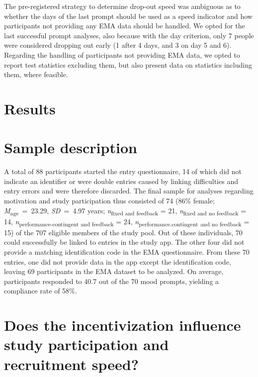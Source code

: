 \documentclass[authordate, empirical]{jote-new-article}
\begin{document}
	The pre-registered strategy to determine drop-out speed was ambiguous as to whether the days of the last prompt should be used as a speed indicator and how participants not providing any EMA data should be handled. We opted for the last successful prompt analyses, also because with the day criterion, only 7 people were considered dropping out early (1 after 4 days, and 3 on day 5 and 6). Regarding the handling of participants not providing EMA data, we opted to report test statistics excluding them, but also present data on statistics including them, where feasible.



	\section{\textbf{Results}}



	\section{\textbf{Sample description}}



	A total of 88 participants started the entry questionnaire, 14 of which did not indicate an identifier or were double entries caused by linking difficulties and entry errors and were therefore discarded. The final sample for analyses regarding motivation and study participation thus consisted of 74 (86\% female; \emph{M}\textsubscript{age}\emph{ }= 23.29, \emph{SD }= 4.97 years; \emph{n}\textsubscript{fixed and feedback }= 21, \emph{n}\textsubscript{fixed and no feedback }= 14, \emph{n}\textsubscript{performance-contingent and feedback }= 24, \emph{n}\textsubscript{performance.contingent}\textsubscript{ and no feedback }= 15) of the 707 eligible members of the study pool. Out of these individuals, 70 could successfully be linked to entries in the study app. The other four did not provide a matching identification code in the EMA questionnaire. From these 70 entries, one did not provide data in the app except the identification code, leaving 69 participants in the EMA dataset to be analyzed. On average, participants responded to 40.7 out of the 70 mood prompts, yielding a compliance rate of 58\%.



	\section{\textbf{Does the incentivization influence study participation and recruitment speed?}}
\end{document}
